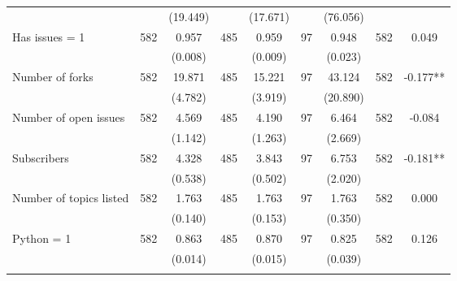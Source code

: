 \begin{tabular}{@{\extracolsep{5pt}}lcccccccc}
 &   & (19.449)  &   & (17.671)  &   & (76.056)  &   &  \\ [1ex]
Has issues = 1   & 582    & 0.957    & 485    & 0.959    & 97    & 0.948    & 582    & 0.049   \\
 &   & (0.008)  &   & (0.009)  &   & (0.023)  &   &  \\ [1ex]
Number of forks   & 582    & 19.871    & 485    & 15.221    & 97    & 43.124    & 582    & -0.177**   \\
 &   & (4.782)  &   & (3.919)  &   & (20.890)  &   &  \\ [1ex]
Number of open issues   & 582    & 4.569    & 485    & 4.190    & 97    & 6.464    & 582    & -0.084   \\
 &   & (1.142)  &   & (1.263)  &   & (2.669)  &   &  \\ [1ex]
Subscribers   & 582    & 4.328    & 485    & 3.843    & 97    & 6.753    & 582    & -0.181**   \\
 &   & (0.538)  &   & (0.502)  &   & (2.020)  &   &  \\ [1ex]
Number of topics listed   & 582    & 1.763    & 485    & 1.763    & 97    & 1.763    & 582    & 0.000   \\
 &   & (0.140)  &   & (0.153)  &   & (0.350)  &   &  \\ [1ex]
Python = 1   & 582    & 0.863    & 485    & 0.870    & 97    & 0.825    & 582    & 0.126   \\
 &   & (0.014)  &   & (0.015)  &   & (0.039)  &   &  \\ [1ex]
\hline \hline \\[-1.8ex]

\end{tabular}

